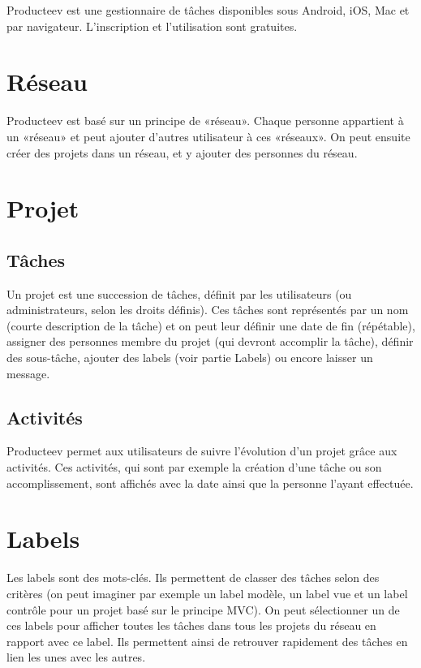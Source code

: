 \documentclass{report}
\begin{document}
Producteev est une gestionnaire de tâches disponibles sous Android, iOS, Mac et par navigateur. L'inscription et l'utilisation sont gratuites.

\section{Réseau}
Producteev est basé sur un principe de «réseau». Chaque personne appartient à un «réseau» et peut ajouter d'autres utilisateur à ces «réseaux». On peut ensuite créer des projets dans un réseau, et y ajouter des personnes du réseau. 

\section{Projet}
\subsection{Tâches}
Un projet est une succession de tâches, définit par les utilisateurs (ou administrateurs, selon les droits définis). Ces tâches sont représentés par un nom (courte description de la tâche) et on peut leur définir une date de fin (répétable), assigner des personnes membre du projet (qui devront accomplir la tâche), définir des sous-tâche, ajouter des labels (voir partie Labels) ou encore laisser un message. 

\subsection{Activités}
Producteev permet aux utilisateurs de suivre l'évolution d'un projet grâce aux activités. Ces activités, qui sont par exemple la création d'une tâche ou son accomplissement, sont affichés avec la date ainsi que la personne l'ayant effectuée.

\section{Labels}
Les labels sont des mots-clés. Ils permettent de classer des tâches selon des critères (on peut imaginer par exemple un label modèle, un label vue et un label contrôle pour un projet basé sur le principe MVC). On peut sélectionner un de ces labels pour afficher toutes les tâches dans tous les projets du réseau en rapport avec ce label. Ils permettent ainsi de retrouver rapidement des tâches en lien les unes avec les autres.
\end{document}
